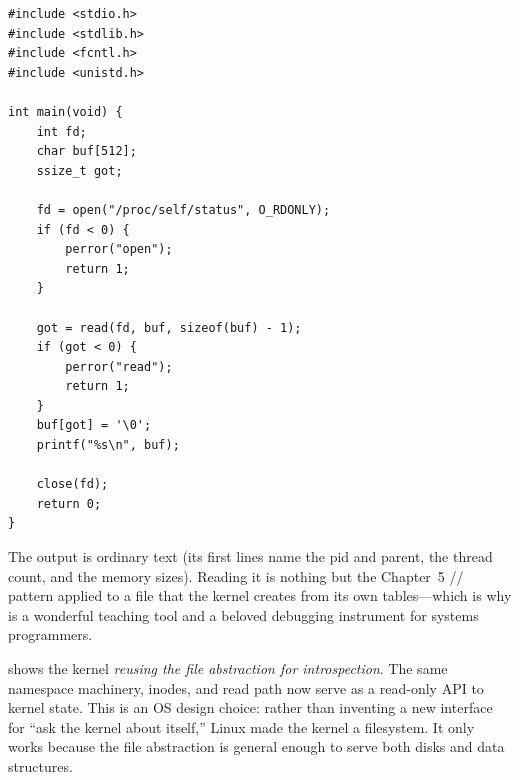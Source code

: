 \begin{lstlisting}[caption={Reading the kernel through a virtual file.}]
#include <stdio.h>
#include <stdlib.h>
#include <fcntl.h>
#include <unistd.h>

int main(void) {
    int fd;
    char buf[512];
    ssize_t got;

    fd = open("/proc/self/status", O_RDONLY);
    if (fd < 0) {
        perror("open");
        return 1;
    }

    got = read(fd, buf, sizeof(buf) - 1);
    if (got < 0) {
        perror("read");
        return 1;
    }
    buf[got] = '\0';
    printf("%s\n", buf);

    close(fd);
    return 0;
}
\end{lstlisting}

The output is ordinary text (its first lines name the pid and parent,
the thread count, and the memory sizes). Reading it is nothing but the
Chapter~5 // pattern applied to a
file that the kernel creates from its own tables---which is why
 is a wonderful teaching tool and a beloved debugging
instrument for systems programmers.

\begin{osconcept}
 shows the kernel \emph{reusing the file abstraction for
introspection}. The same namespace machinery, inodes, and read path
now serve as a read-only API to kernel state. This is an OS design
choice: rather than inventing a new interface for ``ask the kernel
about itself,'' Linux made the kernel a filesystem. It only works
because the file abstraction is general enough to serve both disks and
data structures.
\end{osconcept}

